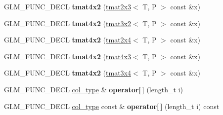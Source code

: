 \begin{DoxyCompactItemize}
\item 
\hypertarget{structglm_1_1detail_1_1tmat4x2_af72c0575d3315a1a7b434dabcefea5aa}{G\-L\-M\-\_\-\-F\-U\-N\-C\-\_\-\-D\-E\-C\-L {\bfseries tmat4x2} (\hyperlink{structglm_1_1detail_1_1tmat2x3}{tmat2x3}$<$ T, P $>$ const \&x)}\label{structglm_1_1detail_1_1tmat4x2_af72c0575d3315a1a7b434dabcefea5aa}

\item 
\hypertarget{structglm_1_1detail_1_1tmat4x2_adbb464ba1329c45ae931b2825114d6cf}{G\-L\-M\-\_\-\-F\-U\-N\-C\-\_\-\-D\-E\-C\-L {\bfseries tmat4x2} (\hyperlink{structglm_1_1detail_1_1tmat3x2}{tmat3x2}$<$ T, P $>$ const \&x)}\label{structglm_1_1detail_1_1tmat4x2_adbb464ba1329c45ae931b2825114d6cf}

\item 
\hypertarget{structglm_1_1detail_1_1tmat4x2_abfac9500ea47ed389da5d877b7b7d716}{G\-L\-M\-\_\-\-F\-U\-N\-C\-\_\-\-D\-E\-C\-L {\bfseries tmat4x2} (\hyperlink{structglm_1_1detail_1_1tmat2x4}{tmat2x4}$<$ T, P $>$ const \&x)}\label{structglm_1_1detail_1_1tmat4x2_abfac9500ea47ed389da5d877b7b7d716}

\item 
\hypertarget{structglm_1_1detail_1_1tmat4x2_a0f0e6e3e2d0a7bc9d9979a132c410298}{G\-L\-M\-\_\-\-F\-U\-N\-C\-\_\-\-D\-E\-C\-L {\bfseries tmat4x2} (\hyperlink{structglm_1_1detail_1_1tmat4x3}{tmat4x3}$<$ T, P $>$ const \&x)}\label{structglm_1_1detail_1_1tmat4x2_a0f0e6e3e2d0a7bc9d9979a132c410298}

\item 
\hypertarget{structglm_1_1detail_1_1tmat4x2_a810689bea267f9f6fc548ad4e237a2a3}{G\-L\-M\-\_\-\-F\-U\-N\-C\-\_\-\-D\-E\-C\-L {\bfseries tmat4x2} (\hyperlink{structglm_1_1detail_1_1tmat3x4}{tmat3x4}$<$ T, P $>$ const \&x)}\label{structglm_1_1detail_1_1tmat4x2_a810689bea267f9f6fc548ad4e237a2a3}

\item 
\hypertarget{structglm_1_1detail_1_1tmat4x2_a63321d20fd080a74dbd14953d339d6fc}{G\-L\-M\-\_\-\-F\-U\-N\-C\-\_\-\-D\-E\-C\-L \hyperlink{structglm_1_1detail_1_1tvec2}{col\-\_\-type} \& {\bfseries operator\mbox{[}$\,$\mbox{]}} (length\-\_\-t i)}\label{structglm_1_1detail_1_1tmat4x2_a63321d20fd080a74dbd14953d339d6fc}

\item 
\hypertarget{structglm_1_1detail_1_1tmat4x2_a3a3555e29c0cd136cd1ba1ddd741c314}{G\-L\-M\-\_\-\-F\-U\-N\-C\-\_\-\-D\-E\-C\-L \hyperlink{structglm_1_1detail_1_1tvec2}{col\-\_\-type} const \& {\bfseries operator\mbox{[}$\,$\mbox{]}} (length\-\_\-t i) const }\label{structglm_1_1detail_1_1tmat4x2_a3a3555e29c0cd136cd1ba1ddd741c314}


\end{DoxyCompactItemize}
